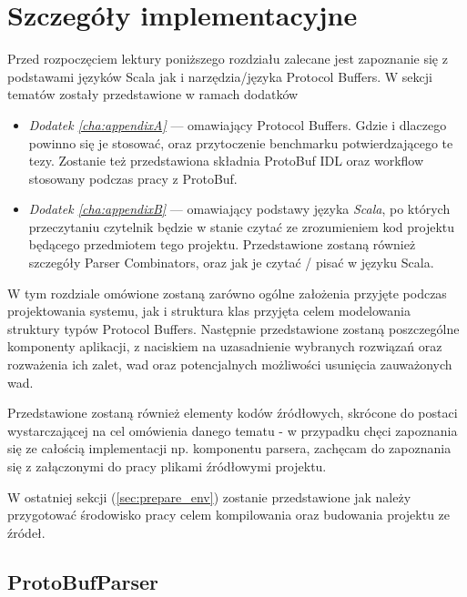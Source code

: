 \documentclass[pdflatex,11pt]{aghdpl}
\begin{document}
\chapter{Szczegóły implementacyjne}
\label{sec:zastosowanePodejscie}

Przed rozpoczęciem lektury poniższego rozdziału zalecane jest zapoznanie się z podstawami języków Scala jak i narzędzia/języka Protocol Buffers. 
W sekcji tematów zostały przedstawione w ramach dodatków 
\begin{itemize}
 \item \textit{Dodatek \ref{cha:appendixA}} --- omawiający Protocol Buffers. Gdzie i dlaczego powinno się je stosować, oraz przytoczenie benchmarku potwierdzającego te tezy.
                                                Zostanie też przedstawiona składnia ProtoBuf IDL oraz workflow stosowany podczas pracy z ProtoBuf.
 \item \textit{Dodatek \ref{cha:appendixB}} --- omawiający podstawy języka \textit{Scala}, po których przeczytaniu czytelnik będzie w stanie czytać ze zrozumieniem kod
                                                projektu będącego przedmiotem tego projektu. Przedstawione zostaną również szczegóły Parser Combinators, oraz jak je czytać / pisać w języku Scala.
\end{itemize}

W tym rozdziale omówione zostaną zarówno ogólne założenia przyjęte podczas projektowania systemu, jak i struktura klas przyjęta celem
modelowania struktury typów Protocol Buffers. Następnie przedstawione zostaną poszczególne komponenty aplikacji, z naciskiem na uzasadnienie
wybranych rozwiązań oraz rozważenia ich zalet, wad oraz potencjalnych możliwości usunięcia zauważonych wad. 

Przedstawione zostaną również elementy kodów źródłowych, skrócone do postaci wystarczającej na cel omówienia danego tematu 
- w przypadku chęci zapoznania się ze całością implementacji np. komponentu parsera, zachęcam do zapoznania się 
z załączonymi do pracy plikami źródłowymi projektu.

W ostatniej sekcji (\ref{sec:prepare_env}) zostanie przedstawione jak należy przygotować środowisko pracy celem kompilowania oraz budowania projektu
ze źródeł.


\newpage
\section{ProtoBufParser}
\label{sec:protoBufParser}
\end{document}
